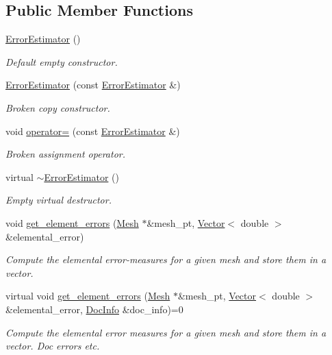 \subsection*{Public Member Functions}
\begin{DoxyCompactItemize}
\item 
\hyperlink{classoomph_1_1ErrorEstimator_a43b3800b6695fe3fd13241b0530a0d0c}{Error\+Estimator} ()
\begin{DoxyCompactList}\small\item\em Default empty constructor. \end{DoxyCompactList}\item 
\hyperlink{classoomph_1_1ErrorEstimator_a264c3159d8f4a07459d08d263d340bf8}{Error\+Estimator} (const \hyperlink{classoomph_1_1ErrorEstimator}{Error\+Estimator} \&)
\begin{DoxyCompactList}\small\item\em Broken copy constructor. \end{DoxyCompactList}\item 
void \hyperlink{classoomph_1_1ErrorEstimator_abebe636e6ad890ee2cea23366f9ac719}{operator=} (const \hyperlink{classoomph_1_1ErrorEstimator}{Error\+Estimator} \&)
\begin{DoxyCompactList}\small\item\em Broken assignment operator. \end{DoxyCompactList}\item 
virtual \hyperlink{classoomph_1_1ErrorEstimator_a57ddd866184d95a75f024353ca936b5b}{$\sim$\+Error\+Estimator} ()
\begin{DoxyCompactList}\small\item\em Empty virtual destructor. \end{DoxyCompactList}\item 
void \hyperlink{classoomph_1_1ErrorEstimator_a3b12c5d2579360a08b6b6298cea8b142}{get\+\_\+element\+\_\+errors} (\hyperlink{classoomph_1_1Mesh}{Mesh} $\ast$\&mesh\+\_\+pt, \hyperlink{classoomph_1_1Vector}{Vector}$<$ double $>$ \&elemental\+\_\+error)
\begin{DoxyCompactList}\small\item\em Compute the elemental error-\/measures for a given mesh and store them in a vector. \end{DoxyCompactList}\item 
virtual void \hyperlink{classoomph_1_1ErrorEstimator_a77e85262d309d6e7da0ca71e98b7afff}{get\+\_\+element\+\_\+errors} (\hyperlink{classoomph_1_1Mesh}{Mesh} $\ast$\&mesh\+\_\+pt, \hyperlink{classoomph_1_1Vector}{Vector}$<$ double $>$ \&elemental\+\_\+error, \hyperlink{classoomph_1_1DocInfo}{Doc\+Info} \&doc\+\_\+info)=0
\begin{DoxyCompactList}\small\item\em Compute the elemental error measures for a given mesh and store them in a vector. Doc errors etc. \end{DoxyCompactList}\end{DoxyCompactItemize}



